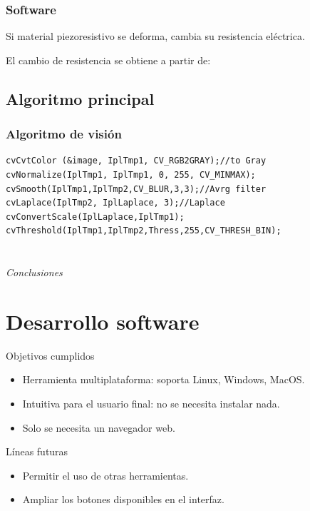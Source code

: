 \documentclass{beamer}
\begin{document}
\begin{frame}
\frametitle{Software}
\begin{outline}
\1 Si material piezoresistivo se deforma, cambia su resistencia eléctrica.


\1 El cambio de resistencia se obtiene a partir de:

\end{outline}
\end{frame}

\subsection{Algoritmo principal}
\begin{frame}[fragile]
\frametitle{Algoritmo de visión}
\begin{lstlisting}
cvCvtColor (&image, IplTmp1, CV_RGB2GRAY);//to Gray
cvNormalize(IplTmp1, IplTmp1, 0, 255, CV_MINMAX);
cvSmooth(IplTmp1,IplTmp2,CV_BLUR,3,3);//Avrg filter
cvLaplace(IplTmp2, IplLaplace, 3);//Laplace
cvConvertScale(IplLaplace,IplTmp1);
cvThreshold(IplTmp1,IplTmp2,Thress,255,CV_THRESH_BIN);
\end{lstlisting}
\end{frame}

\section*{}
\begin{frame}{}
  \centering \Huge
  \emph{Conclusiones}
\end{frame}

\section{Desarrollo software}
\begin{frame}
\begin{block}{Objetivos cumplidos}
\begin{itemize}
\item Herramienta multiplataforma: soporta Linux, Windows, MacOS.
\item Intuitiva para el usuario final: no se necesita instalar nada.
\item Solo se necesita un navegador web.
\end{itemize}
\end{block}

\begin{block}{Líneas futuras}
\begin{itemize}
\item Permitir el uso de otras herramientas.
\item Ampliar los botones disponibles en el interfaz.
\end{itemize}
\end{block}
\end{frame}
\end{document}
